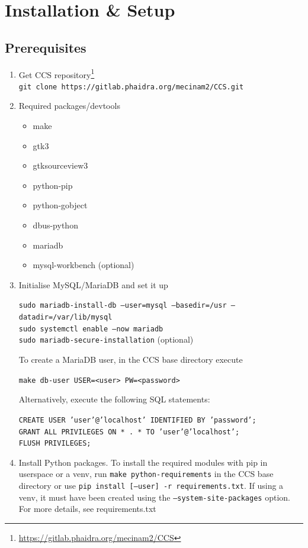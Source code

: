 \chapter{Installation \& Setup}

\section{Prerequisites}
\begin{enumerate}
\item Get CCS repository\footnote{\href{https://gitlab.phaidra.org/mecinam2/CCS}{https://gitlab.phaidra.org/mecinam2/CCS}}\vspace{5pt}\\
\texttt{git clone https://gitlab.phaidra.org/mecinam2/CCS.git}
    
\item Required packages/devtools
\begin{itemize}
  \item make
  \item gtk3
  \item gtksourceview3
  \item python-pip
  \item python-gobject
  \item dbus-python
  \item mariadb
  \item mysql-workbench (optional)
\end{itemize}

\item Initialise MySQL/MariaDB and set it up

\texttt{sudo mariadb-install-db --user=mysql --basedir=/usr --datadir=/var/lib/mysql}\\
\texttt{sudo systemctl enable --now mariadb}\\
\texttt{sudo mariadb-secure-installation}  (optional)

    To create a MariaDB user, in the CCS base directory execute
    
	\texttt{make db-user USER=<user> PW=<password>}

    Alternatively, execute the following SQL statements:
    
	\texttt{CREATE USER 'user'@'localhost' IDENTIFIED BY 'password';}\\
	\texttt{GRANT ALL PRIVILEGES ON * . * TO 'user'@'localhost';}\\
	\texttt{FLUSH PRIVILEGES;}
    
\item {Install Python packages. To install the required modules with pip in userspace or a venv, run
   \texttt{make python-requirements} in the CCS base directory or use \texttt{pip install [--user] -r requirements.txt}.
   If using a venv, it must have been created using the \texttt{--system-site-packages} option.
   For more details, see requirements.txt}
\end{enumerate}

